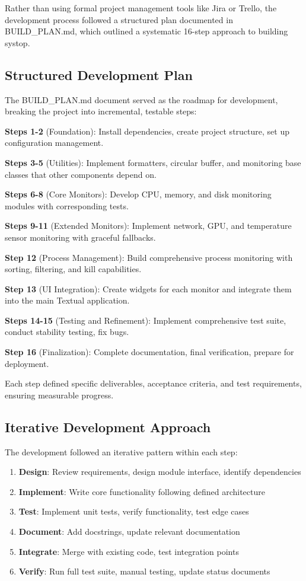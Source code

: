 \documentclass[12pt,a4paper,oneside]{report}
\begin{document}
Rather than using formal project management tools like Jira or Trello, the development process followed a structured plan documented in BUILD\_PLAN.md, which outlined a systematic 16-step approach to building systop.

\subsection{Structured Development Plan}

The BUILD\_PLAN.md document served as the roadmap for development, breaking the project into incremental, testable steps:

\textbf{Steps 1-2} (Foundation): Install dependencies, create project structure, set up configuration management.

\textbf{Steps 3-5} (Utilities): Implement formatters, circular buffer, and monitoring base classes that other components depend on.

\textbf{Steps 6-8} (Core Monitors): Develop CPU, memory, and disk monitoring modules with corresponding tests.

\textbf{Steps 9-11} (Extended Monitors): Implement network, GPU, and temperature sensor monitoring with graceful fallbacks.

\textbf{Step 12} (Process Management): Build comprehensive process monitoring with sorting, filtering, and kill capabilities.

\textbf{Step 13} (UI Integration): Create widgets for each monitor and integrate them into the main Textual application.

\textbf{Steps 14-15} (Testing and Refinement): Implement comprehensive test suite, conduct stability testing, fix bugs.

\textbf{Step 16} (Finalization): Complete documentation, final verification, prepare for deployment.

Each step defined specific deliverables, acceptance criteria, and test requirements, ensuring measurable progress.

\subsection{Iterative Development Approach}

The development followed an iterative pattern within each step:

\begin{enumerate}
    \item \textbf{Design}: Review requirements, design module interface, identify dependencies
    \item \textbf{Implement}: Write core functionality following defined architecture
    \item \textbf{Test}: Implement unit tests, verify functionality, test edge cases
    \item \textbf{Document}: Add docstrings, update relevant documentation
    \item \textbf{Integrate}: Merge with existing code, test integration points
    \item \textbf{Verify}: Run full test suite, manual testing, update status documents
\end{enumerate}
\end{document}
